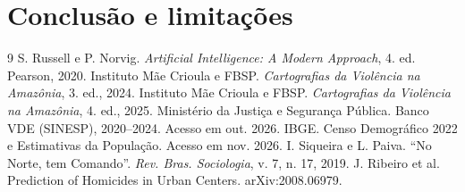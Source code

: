 \documentclass[10pt,a4paper,twocolumn]{article}
\begin{document}
\section{Conclusão e limitações}

\begin{thebibliography}{9}
 S. Russell e P. Norvig. \emph{Artificial Intelligence: A Modern Approach}, 4. ed. Pearson, 2020.
 Instituto Mãe Crioula e FBSP. \emph{Cartografias da Violência na Amazônia}, 3. ed., 2024.
 Instituto Mãe Crioula e FBSP. \emph{Cartografias da Violência na Amazônia}, 4. ed., 2025.
 Ministério da Justiça e Segurança Pública. Banco VDE (SINESP), 2020--2024. Acesso em out. 2026.
 IBGE. Censo Demográfico 2022 e Estimativas da População. Acesso em nov. 2026.
 I. Siqueira e L. Paiva. ``No Norte, tem Comando''. \emph{Rev. Bras. Sociologia}, v. 7, n. 17, 2019.
 J. Ribeiro et al. Prediction of Homicides in Urban Centers. arXiv:2008.06979.
\end{thebibliography}
\end{document}
